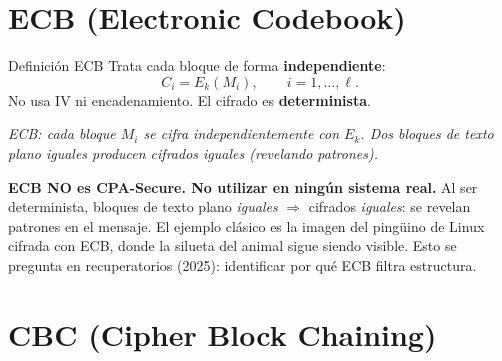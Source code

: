 \documentclass[11pt,a4paper]{article}
\newcommand{\diagcaption}[1]{\begin{center}\small\textit{#1}\end{center}}
\begin{document}
\section{ECB (Electronic Codebook)}

\begin{definicion}{Definici\'on ECB}
  Trata cada bloque de forma \textbf{independiente}:
  \[
    C_i = E_k(M_i), \qquad i = 1, \ldots, \ell.
  \]
  No usa IV ni encadenamiento. El cifrado es \textbf{determinista}.
\end{definicion}

\begin{center}
\end{center}
\diagcaption{ECB: cada bloque $M_i$ se cifra independientemente con $E_k$.
  Dos bloques de texto plano iguales producen cifrados iguales (revelando
  patrones).}

\begin{ojo}
  \textbf{ECB NO es CPA-Secure. No utilizar en ning\'un sistema real.}
  Al ser determinista, bloques de texto plano \emph{iguales} $\Rightarrow$
  cifrados \emph{iguales}: se revelan patrones en el mensaje. El ejemplo cl\'asico
  es la imagen del ping\"uino de Linux cifrada con ECB, donde la silueta del
  animal sigue siendo visible. Esto se pregunta en recuperatorios (2025):
  identificar por qu\'e ECB filtra estructura.
\end{ojo}

\section{CBC (Cipher Block Chaining)}
\end{document}
